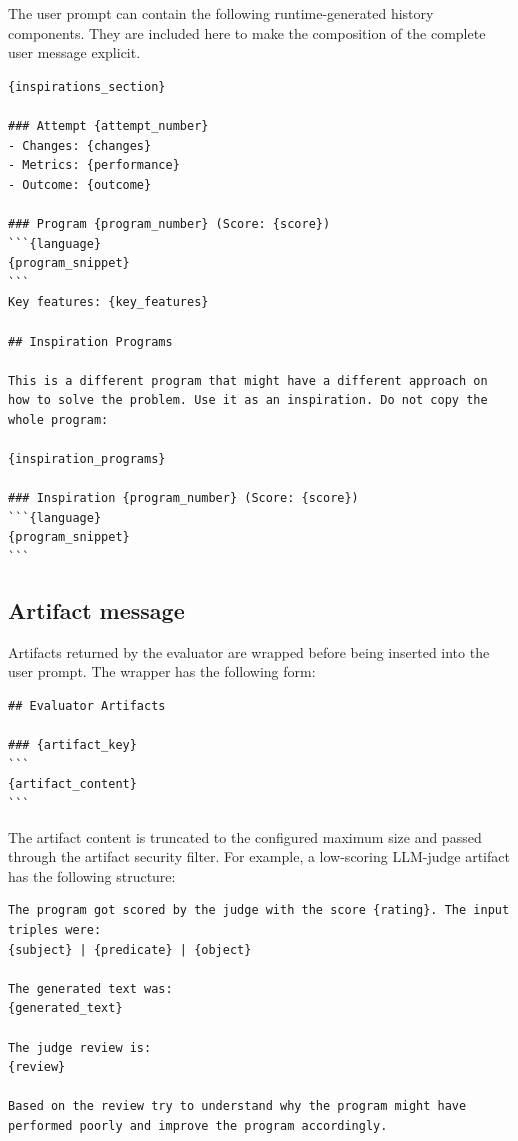 The user prompt can contain the following runtime-generated history components.
They are included here to make the composition of the complete user message
explicit.

\begin{lstlisting}
{inspirations_section}

### Attempt {attempt_number}
- Changes: {changes}
- Metrics: {performance}
- Outcome: {outcome}

### Program {program_number} (Score: {score})
```{language}
{program_snippet}
```
Key features: {key_features}

## Inspiration Programs

This is a different program that might have a different approach on how to solve the problem. Use it as an inspiration. Do not copy the whole program:

{inspiration_programs}

### Inspiration {program_number} (Score: {score})
```{language}
{program_snippet}
```
\end{lstlisting}

\subsection{Artifact message}
\label{app:prompt-artifact-message}

Artifacts returned by the evaluator are wrapped before being inserted into the
user prompt. The wrapper has the following form:

\begin{lstlisting}
## Evaluator Artifacts

### {artifact_key}
```
{artifact_content}
```
\end{lstlisting}

The artifact content is truncated to the configured maximum size and passed
through the artifact security filter. For example, a low-scoring LLM-judge
artifact has the following structure:

\begin{lstlisting}
The program got scored by the judge with the score {rating}. The input triples were:
{subject} | {predicate} | {object}

The generated text was:
{generated_text}

The judge review is:
{review}

Based on the review try to understand why the program might have performed poorly and improve the program accordingly.
\end{lstlisting}


